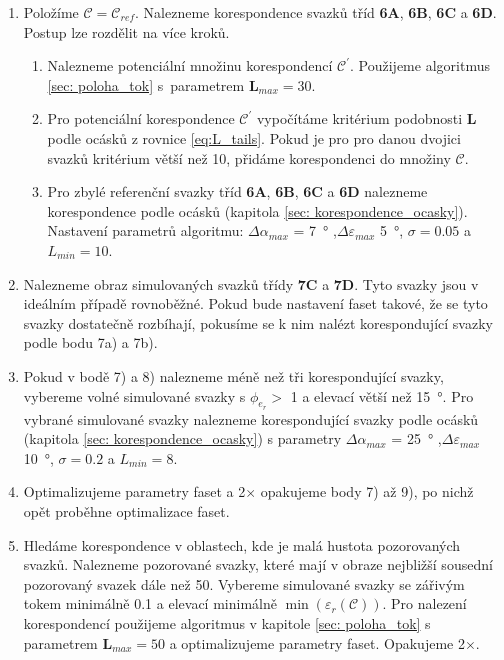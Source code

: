 \begin{enumerate}
\item Položíme $\mathcal{C} = \mathcal{C}_{ref}$. Nalezneme korespondence svazků tříd \textbf{6A}, \textbf{6B}, \textbf{6C} a \textbf{6D}. Postup lze rozdělit na více kroků. 

\begin{enumerate}[label={\alph*)}]
	\item Nalezneme potenciální množinu korespondencí $\mathcal{C}^\prime$. Použijeme algoritmus \ref{sec: poloha_tok} s~parametrem  $\mathbf{L}_{max} = 30$.
	
	\item Pro potenciální korespondence $\mathcal{C}^\prime$ vypočítáme kritérium podobnosti $\mathbf{L}$ podle ocásků z rovnice  \ref{eq:L_tails}. Pokud je pro pro danou dvojici svazků kritérium větší než 10, přidáme korespondenci do množiny $\mathcal{C}$. 
	
	\item Pro zbylé referenční svazky tříd \textbf{6A}, \textbf{6B}, \textbf{6C} a \textbf{6D} nalezneme korespondence podle ocásků (kapitola \ref{sec: korespondence_ocasky}). Nastavení parametrů algoritmu: $\Delta\alpha_{max}$ = \SI{7}{\degree} ,$\Delta\varepsilon_{max}$ \SI{5}{\degree}, $\sigma = 0.05$ a $L_{min} = 10$.
\end{enumerate}

\item Nalezneme obraz simulovaných svazků třídy \textbf{7C} a \textbf{7D}. Tyto svazky jsou v ideálním případě rovnoběžné. Pokud bude nastavení faset takové, že se tyto svazky dostatečně rozbíhají, pokusíme se k nim nalézt korespondující svazky podle bodu 7a) a 7b). 

\item Pokud v bodě 7) a 8) nalezneme méně než tři korespondující svazky, vybereme volné simulované svazky s $\phi_{e_r} > $ \SI{1}{\permille} a elevací větší než \SI{15}{\degree}. Pro vybrané simulované svazky nalezneme korespondující svazky podle ocásků (kapitola \ref{sec: korespondence_ocasky}) s parametry $\Delta\alpha_{max}$ = \SI{25}{\degree} ,$\Delta\varepsilon_{max}$ \SI{10}{\degree}, $\sigma = 0.2$ a $L_{min} = 8$.

\item Optimalizujeme parametry faset a 2$\times$ opakujeme body 7) až 9), po nichž opět proběhne optimalizace faset.  

\item Hledáme korespondence v oblastech, kde je malá hustota pozorovaných svazků. Nalezneme pozorované svazky, které mají v obraze nejbližší sousední pozorovaný svazek dále než \SI{50}{\px}. Vybereme simulované svazky se zářivým tokem minimálně  \SI{0.1}{\permille} a elevací minimálně $\min(\varepsilon_r(\mathcal{C}))$. Pro nalezení korespondencí použijeme algoritmus v kapitole  \ref{sec: poloha_tok} s parametrem $\mathbf{L}_{max} = 50$ a optimalizujeme parametry faset. Opakujeme 2$\times$.


\end{enumerate}
